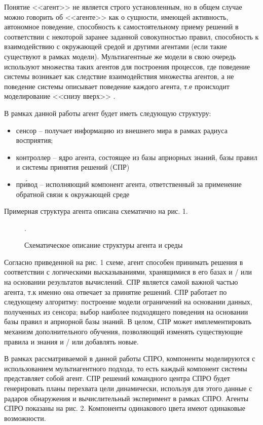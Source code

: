 Понятие <<агент>> не является строго установленным, но в общем случае можно говорить об <<агенте>> как о сущности, имеющей активность, автономное поведение, способность к самостоятельному приему решений в соответствии  с некоторой заранее заданной совокупностью правил, способность к взаимодействию  с окружающей средой и другими агентами (если такие существуют в рамках модели). Мультиагентные же модели в свою очередь используют множества таких агентов для построения процессов, где поведение системы возникает как следствие взаимодействия множества агентов, а не поведение системы описывает поведение каждого агента, т.е происходит моделирование <<снизу вверх>> \cite{Wooldridge:2002}.

В рамках данной работы агент будет иметь следующую структуру:
\begin{itemize}
	
	\item сенсор -- получает информацию из внешнего мира в рамках радиуса восприятия;
	\item контроллер -- ядро агента, состоящее из базы априорных знаний, базы правил и системы  принятия решений (СПР)
	\item пр\'{и}вод -- исполняющий компонент агента, ответственный за применение обратной связи к окружающей среде  

\end{itemize}

Примерная структура агента описана схематично на рис. 1.

\begin{figure*}[h!]
	\caption{Схематическое описание структуры агента и среды}.
\end{figure*} 

Согласно приведенной на рис. 1 схеме, агент способен принимать решения в соответствии с логическими  высказываниями, хранящимися в его базах и / или на основании результатов вычислений. СПР является самой важной частью агента, т.к именно она отвечает за принятие решений. СПР работает по следующему алгоритму: построение модели ограничений на основании данных, полученных из сенсора; выбор наиболее подходящего поведения на основании базы правил и априорной базы знаний.  В целом, СПР может имплементировать механизм дополнительного обучения, позволяющий изменять существующие правила и знания и / или добавлять новые.  

В рамках рассматриваемой в данной работы СПРО, компоненты моделируются с использованием мультиагентного подхода, то есть каждый компонент системы представляет собой агент. СПР решений командного центра СПРО будет генерировать планы перехвата цели динамически, используя для этого данные с радаров обнаружения и вычислительный эксперимент в рамках СПРО. Агенты СПРО показаны на рис. 2. Компоненты одинакового цвета имеют одинаковые возможности. 

